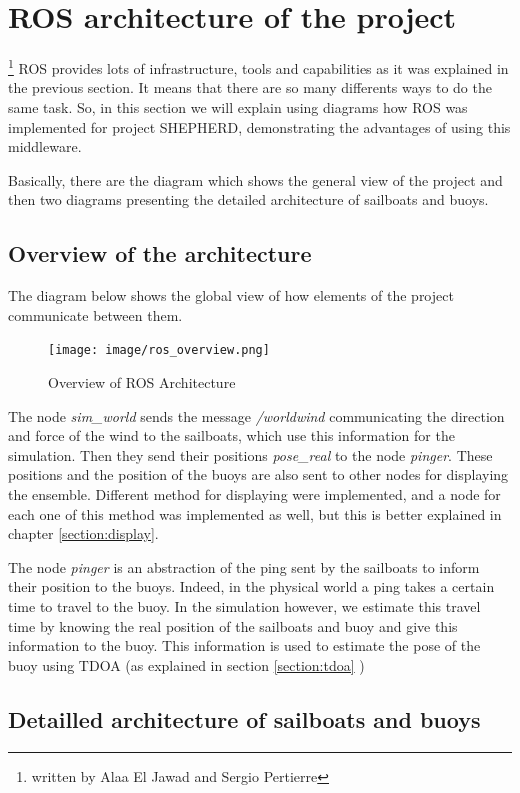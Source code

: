 \documentclass[a4paper]{report}
\begin{document}
\section{ROS architecture of the project}
	\footnote{written by Alaa El Jawad and Sergio Pertierre}  
ROS provides lots of infrastructure, tools and capabilities as it was explained in the previous section. It means that there are so many differents ways to do the same task. So, in this section we will explain using diagrams how ROS was implemented for project SHEPHERD, demonstrating the advantages of using this middleware.

Basically, there are the diagram which shows the general view of the project and then two diagrams presenting the detailed architecture of sailboats and buoys.
\subsection{Overview of the architecture}
The diagram below shows the global view of how elements of the project communicate between them.

\begin{figure}[H]
	\centering
	\texttt{[image: image/ros\_overview.png]}
	\caption{Overview of ROS Architecture}
	\label{fig:ros_overview}
\end{figure}

The node \textit{sim\_world} sends the message \textit{/worldwind} communicating the direction and force of the wind to the sailboats, which use this information for the simulation. Then they send their positions \textit{pose\_real} to the node \textit{pinger}. These positions and the position of the buoys are also sent to other nodes for displaying the ensemble. Different method for displaying were implemented, and a node for each one of this method was implemented as well, but this is better explained in chapter \ref{section:display}.

The node \textit{pinger} is an abstraction of the ping sent by the sailboats to inform their position to the buoys. Indeed, in the physical world a ping takes a certain time to travel to the buoy. In the simulation however, we estimate this travel time by knowing the real position of the sailboats and buoy and give this information to the buoy. This information is used to estimate the pose of the buoy using TDOA (as explained in section \ref{section:tdoa} )

\subsection{Detailled architecture of sailboats and buoys}
\end{document}
